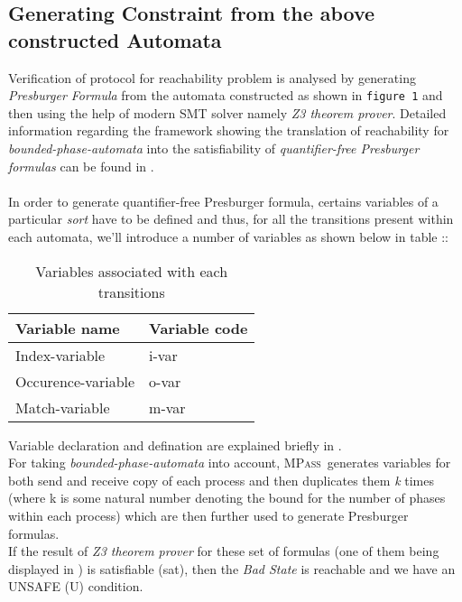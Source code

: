 \documentclass[a4paper]{article}
\newcommand{\MPass}{\textsc{MPass}}
\begin{document}
\subsection{Generating Constraint from the above constructed Automata}

Verification of protocol for reachability problem is analysed by generating \emph{Presburger Formula} from the automata 
constructed as shown in {\tt figure 1} and then using the help of modern SMT solver namely \emph{Z3 theorem prover}. 
Detailed information regarding the framework showing the translation of reachability for \emph{bounded-phase-automata} 
into the satisfiability of \emph{quantifier-free Presburger formulas} can be found in \cite{AAC13}.\\\\

In order to generate quantifier-free Presburger formula, certains variables of a particular \emph{sort} have to be 
defined and thus, for all the transitions present within each automata, we'll introduce a number of variables as shown below in table ::

\begin{table}[ht]
  \begin{center}
    \begin{tabular}{|l|l|}
      \hline
      Variable name & Variable code\\
      \hline
      Index-variable & i-var\\
      Occurence-variable & o-var\\
      Match-variable & m-var\\
      \hline
    \end{tabular}
  \end{center}
  \caption{Variables associated with each transitions}\label{tbl:variables}
\end{table}

Variable declaration and defination are explained briefly in \cite{AAC13}.\\
For taking \emph{bounded-phase-automata} into account, \MPass\ generates variables for both send and receive copy of 
each process and then duplicates them \emph{k} times (where k is some natural number denoting the bound for the number of phases within each process) which are then further used to generate Presburger formulas.\\
If the result of \emph{Z3 theorem prover} for these set of formulas (one of them being displayed in ) is 
satisfiable (sat), then the \emph{Bad State} is reachable and we have an UNSAFE (U) condition.
\end{document}
